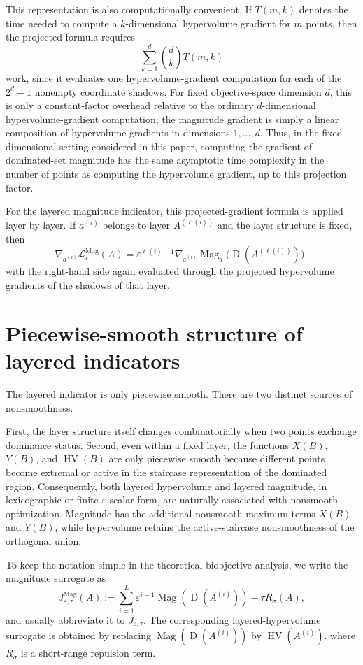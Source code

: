 \documentclass{article}
\newcommand{\Mag}{\operatorname{Mag}}
\newcommand{\HV}{\operatorname{HV}}
\newcommand{\front}[1]{A^{(#1)}}
\newcommand{\Dom}{\operatorname{D}}
\begin{document}
This representation is also computationally convenient.  If $T(m,k)$ denotes the time needed to compute a $k$-dimensional hypervolume gradient for $m$ points, then the projected formula requires
\[
\sum_{k=1}^{d}\binom{d}{k}T(m,k)
\]
work, since it evaluates one hypervolume-gradient computation for each of the $2^d-1$ nonempty coordinate shadows.  For fixed objective-space dimension $d$, this is only a constant-factor overhead relative to the ordinary $d$-dimensional hypervolume-gradient computation; the magnitude gradient is simply a linear composition of hypervolume gradients in dimensions $1,\dots,d$.  Thus, in the fixed-dimensional setting considered in this paper, computing the gradient of dominated-set magnitude has the same asymptotic time complexity in the number of points as computing the hypervolume gradient, up to this projection factor.

For the layered magnitude indicator, this projected-gradient formula is applied layer by layer.  If $a^{(i)}$ belongs to layer $\front{\ell(i)}$ and the layer structure is fixed, then
\[
\nabla_{a^{(i)}}\mathcal L_{\varepsilon}^{\Mag}(A)
=
\varepsilon^{\ell(i)-1}
\nabla_{a^{(i)}}\Mag_d\bigl(\Dom(\front{\ell(i)})\bigr),
\]
with the right-hand side again evaluated through the projected hypervolume gradients of the shadows of that layer.

\section{Piecewise-smooth structure of layered indicators}
The layered indicator is only piecewise smooth. There are two distinct sources of nonsmoothness.

First, the layer structure itself changes combinatorially when two points exchange dominance status. Second, even within a fixed layer, the functions $X(B)$, $Y(B)$, and $\HV(B)$ are only piecewise smooth because different points become extremal or active in the staircase representation of the dominated region. Consequently, both layered hypervolume and layered magnitude, in lexicographic or finite-$\varepsilon$ scalar form, are naturally associated with nonsmooth optimization.  Magnitude has the additional nonsmooth maximum terms $X(B)$ and $Y(B)$, while hypervolume retains the active-staircase nonsmoothness of the orthogonal union.

To keep the notation simple in the theoretical biobjective analysis, we write the magnitude surrogate as
\[
J^{\Mag}_{\varepsilon,\tau}(A):=\sum_{i=1}^{L}\varepsilon^{i-1}\Mag(\Dom(\front{i}))-\tau R_\sigma(A),
\]
and usually abbreviate it to $J_{\varepsilon,\tau}$.  The corresponding layered-hypervolume surrogate is obtained by replacing $\Mag(\Dom(\front{i}))$ by $\HV(\front{i})$.
where $R_\sigma$ is a short-range repulsion term.
\end{document}

